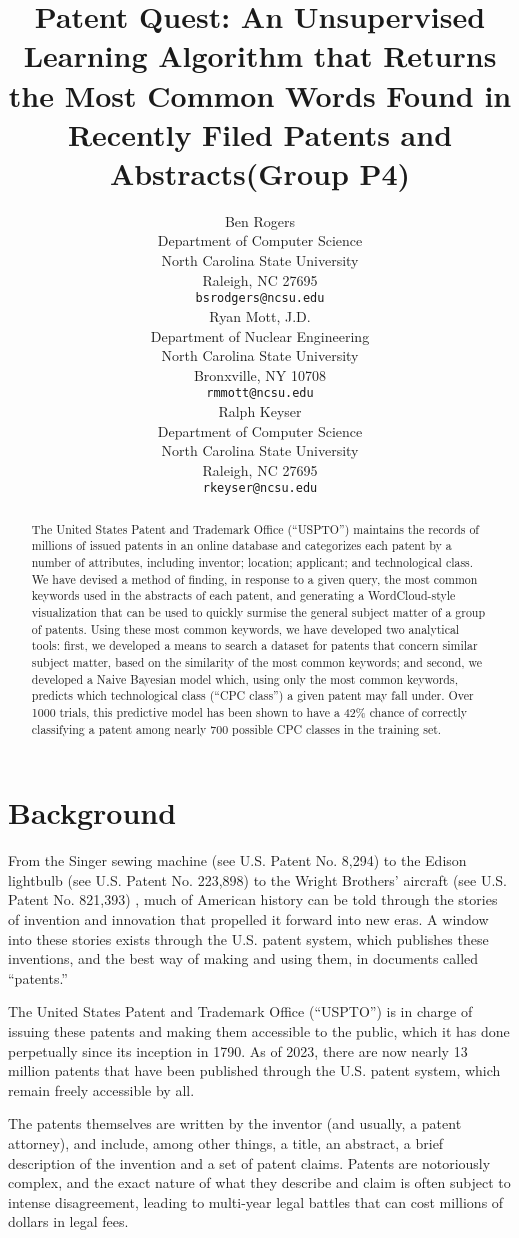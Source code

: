 \documentclass{article}
\title{Patent Quest: An Unsupervised Learning Algorithm that Returns the Most Common Words Found in Recently Filed Patents and Abstracts\newline (Group P4)}
\author{%
  Ben Rogers\\
  Department of Computer Science\\
  North Carolina State University\\
  Raleigh, NC 27695 \\
  \texttt{bsrodgers@ncsu.edu} \\
  \And
  Ryan Mott, J.D.\\
  Department of Nuclear Engineering \\
  North Carolina State University \\
  Bronxville, NY 10708 \\
  \texttt{rmmott@ncsu.edu} \\
  \And
  Ralph Keyser \\
  Department of Computer Science \\
  North Carolina State University \\
  Raleigh, NC 27695 \\
  \texttt{rkeyser@ncsu.edu} \\
}
\begin{document}
\maketitle

\begin{abstract}				
The United States Patent and Trademark Office (“USPTO”) maintains the records of millions of issued patents in an online database and categorizes each patent by a number of attributes, including inventor; location; applicant; and technological class.  We have devised a method of finding, in response to a given query, the most common keywords used in the abstracts of each patent, and generating a WordCloud-style visualization that can be used to quickly surmise the general subject matter of a group of patents. Using these most common keywords, we have developed two analytical tools: first, we developed a means to search a dataset for patents that concern similar subject matter, based on the similarity of the most common keywords; and second, we developed a Naive Bayesian model which, using only the most common keywords, predicts which technological class (“CPC class”) a given patent may fall under.  Over 1000 trials, this predictive model has been shown to have a 42\% chance of correctly classifying a patent among nearly 700 possible CPC classes in the training set.
\end{abstract}


\section{Background}
From the Singer sewing machine (see U.S. Patent No. 8,294) to the Edison lightbulb (see U.S. Patent No. 223,898) to the Wright Brothers’ aircraft (see U.S. Patent No. 821,393) , much of American history can be told through the stories of invention and innovation that propelled it forward into new eras. A window into these stories exists through the U.S. patent system, which publishes these inventions, and the best way of making and using them, in documents called “patents.”

The United States Patent and Trademark Office (“USPTO”) is in charge of issuing these patents and making them accessible to the public, which it has done perpetually since its inception in 1790\cite{website:usptoms}. As of 2023, there are now nearly 13 million patents that have been published through the U.S. patent system, which remain freely accessible by all\cite{website:usptoacc}.

The patents themselves are written by the inventor (and usually, a patent attorney), and include, among other things, a title, an abstract, a brief description of the invention and a set of patent claims\cite{website:patent1}.   Patents are notoriously complex, and the exact nature of what they describe and claim is often subject to intense disagreement, leading to multi-year legal battles that can cost millions of dollars in legal fees\cite{website:aipla}.
\end{document}
